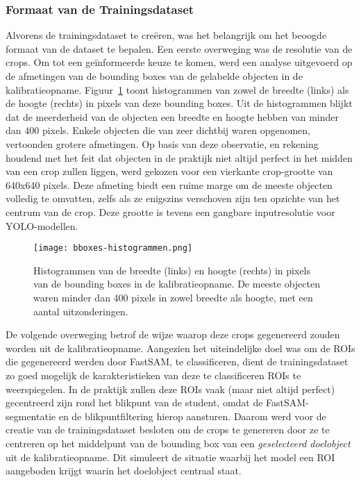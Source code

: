 \subsubsection{Formaat van de Trainingsdataset}

Alvorens de trainingsdataset te creëren, was het belangrijk om het beoogde formaat van de dataset te bepalen.
Een eerste overweging was de resolutie van de crops. 
Om tot een geïnformeerde keuze te komen, werd een analyse uitgevoerd op de afmetingen van de bounding boxes 
van de gelabelde objecten in de kalibratieopname. 
Figuur~\ref{fig:size-histogram} toont histogrammen van zowel de breedte (links) als de hoogte (rechts) 
in pixels van deze bounding boxes. 
Uit de histogrammen blijkt dat de meerderheid van de objecten een breedte en hoogte hebben van minder dan 400 pixels. 
Enkele objecten die van zeer dichtbij waren opgenomen, vertoonden grotere afmetingen. 
Op basis van deze observatie, en rekening houdend met het feit dat objecten in de praktijk 
niet altijd perfect in het midden van een crop zullen liggen, 
werd gekozen voor een vierkante crop-grootte van 640x640 pixels. 
Deze afmeting biedt een ruime marge om de meeste objecten volledig te omvatten, zelfs als ze enigszins 
verschoven zijn ten opzichte van het centrum van de crop. 
Deze grootte is tevens een gangbare inputresolutie voor YOLO-modellen.

\begin{figure}[H]
    \centering
    \texttt{[image: bboxes-histogrammen.png]}
    \caption[Histogrammen van de breedte en grootte in pixels van bounding boxes in de kalibratieopname]{
      \label{fig:size-histogram}
      Histogrammen van de breedte (links) en hoogte (rechts) in pixels van de bounding boxes in de kalibratieopname.
      De meeste objecten waren minder dan 400 pixels in zowel breedte als hoogte, met een aantal uitzonderingen.
    }
\end{figure}

De volgende overweging betrof de wijze waarop deze crops gegenereerd zouden worden uit de kalibratieopname. 
Aangezien het uiteindelijke doel was om de ROIs die gegenereerd werden door FastSAM, te classificeren, 
dient de trainingsdataset zo goed mogelijk de karakteristieken van deze te classificeren ROIs te weerspiegelen. 
In de praktijk zullen deze ROIs vaak (maar niet altijd perfect) gecentreerd zijn rond het blikpunt van de student, 
omdat de FastSAM-segmentatie en de blikpuntfiltering hierop aansturen. 
Daarom werd voor de creatie van de trainingsdataset besloten om de crops te genereren 
door ze te centreren op het middelpunt van de bounding box van een \textit{geselecteerd doelobject} uit de kalibratieopname. 
Dit simuleert de situatie waarbij het model een ROI aangeboden krijgt waarin het doelobject centraal staat.

